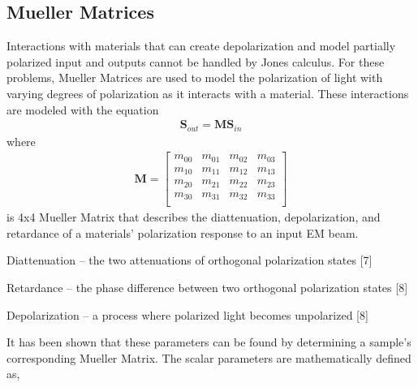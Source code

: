 \subsection{Mueller Matrices}
Interactions with materials that can create depolarization and model partially polarized input and outputs cannot be handled by Jones calculus.  For these problems, Mueller Matrices are used to model the polarization of light with varying degrees of polarization as it interacts with a material.  These interactions are modeled with the equation
\begin{align}
    \mathbf{S}_{out} = \mathbf{M}\mathbf{S}_{in}
\end{align}
%
where
%
\begin{align}
    \mathbf{M} =
    \begin{bmatrix}
        m_{00} & m_{01} & m_{02} & m_{03} \\
        m_{10} & m_{11} & m_{12} & m_{13} \\
        m_{20} & m_{21} & m_{22} & m_{23} \\
        m_{30} & m_{31} & m_{32} & m_{33} \\
    \end{bmatrix}
\end{align}
%
is 4x4 Mueller Matrix that describes the diattenuation, depolarization, and retardance of a materials' polarization response to an input EM beam.

Diattenuation – the two attenuations of orthogonal polarization states [7]

Retardance – the phase difference between two orthogonal polarization states [8]

Depolarization – a process where polarized light becomes unpolarized [8]

It has been shown that these parameters can be found by determining a sample's corresponding Mueller Matrix. The scalar parameters are mathematically defined as,
\begin{align}
\end{align}

